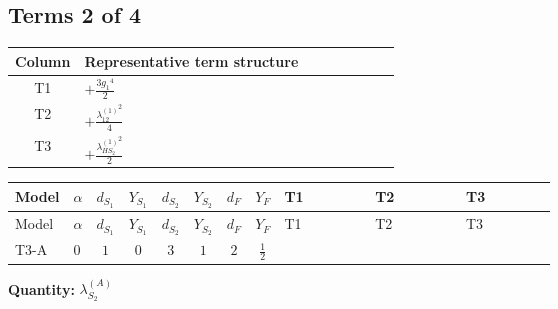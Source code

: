\documentclass[8pt]{article}
\begin{document}
\begin{landscape}
\subsection*{Terms 2 of 4}
\begin{center}
\begin{tabular}{@{}c >{\raggedright\arraybackslash}p{0.82\linewidth}@{}}
\toprule
Column & Representative term structure \\
\midrule
T1 & \(\displaystyle +\frac{3 {g_1}^4}{2}\) \\
\midrule
T2 & \(\displaystyle +\frac{{\lambda_{12}^{(1)}}^2}{4}\) \\
\midrule
T3 & \(\displaystyle +\frac{{\lambda_{HS_2}^{(1)}}^2}{2}\) \\
\midrule
\bottomrule
\end{tabular}
\end{center}
\smallskip
\tiny
\begin{longtable}{@{}llcccccc >{\raggedright\arraybackslash}p{0.21\linewidth} >{\raggedright\arraybackslash}p{0.21\linewidth} >{\raggedright\arraybackslash}p{0.21\linewidth}@{}}
\toprule
Model & $\alpha$ & $d_{S_1}$ & $Y_{S_1}$ & $d_{S_2}$ & $Y_{S_2}$ & $d_F$ & $Y_F$ & T1 & T2 & T3 \\
\midrule
\endfirsthead
\toprule
Model & $\alpha$ & $d_{S_1}$ & $Y_{S_1}$ & $d_{S_2}$ & $Y_{S_2}$ & $d_F$ & $Y_F$ & T1 & T2 & T3 \\
\midrule
\endhead
T3-A & $0$ & $1$ & $0$ & $3$ & $1$ & $2$ & $\frac{1}{2}$ & \scriptsize\adjustbox{max width=\linewidth}{$\begin{gathered} +\frac{3 {g_1}^4}{2}\end{gathered}$} & \scriptsize\adjustbox{max width=\linewidth}{$\begin{gathered} +\frac{{\lambda_{12}^{(1)}}^2}{4}\end{gathered}$} & \scriptsize\adjustbox{max width=\linewidth}{$\begin{gathered} +\frac{{\lambda_{HS_2}^{(1)}}^2}{2}\end{gathered}$} \\
\midrule
\bottomrule
\end{longtable}
\clearpage
\noindent\textbf{Quantity: }$\lambda_{S_2}^{(A)}$\par\smallskip

\end{landscape}
\end{document}
